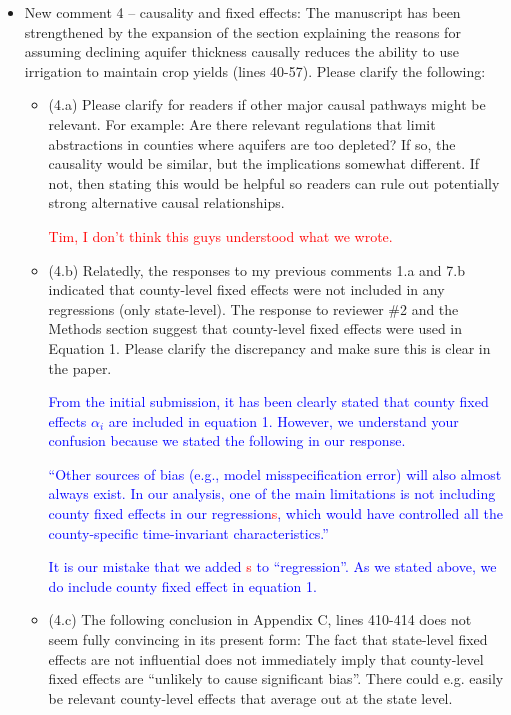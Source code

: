 \documentclass[
]{article}
\begin{document}
\begin{itemize}
\item New comment 4 – causality and fixed effects: The manuscript has been strengthened by the expansion of the section explaining the reasons for assuming declining aquifer thickness causally reduces the ability to use irrigation to maintain crop yields (lines 40-57). Please clarify the following:

  \begin{itemize}
  \item (4.a) Please clarify for readers if other major causal pathways might be relevant. For example: Are there relevant regulations that limit abstractions in counties where aquifers are too depleted? If so, the causality would be similar, but the implications somewhat different. If not, then stating this would be helpful so readers can rule out potentially strong alternative causal relationships.

  \textcolor{red}{Tim, I don't think this guys understood what we wrote.}
  
  \item (4.b) Relatedly, the responses to my previous comments 1.a and 7.b indicated that county-level fixed effects were not included in any regressions (only state-level). The response to reviewer \#2 and the Methods section suggest that county-level fixed effects were used in Equation 1. Please clarify the discrepancy and make sure this is clear in the paper.

  \textcolor{blue}{From the initial submission, it has been clearly stated that county fixed effects $\alpha_i$ are included in equation 1. However, we understand your confusion because we stated the following in our response.}

  \textcolor{blue}{``Other sources of bias (e.g., model misspecification error) will also almost always
exist. In our analysis, one of the main limitations is not including county fixed effects in our regression\textcolor{red}{s}, which would have controlled all the county-specific time-invariant characteristics.''}

  \textcolor{blue}{It is our mistake that we added \textcolor{red}{s} to ``regression''. As we stated above, we do include county fixed effect in equation 1. }
  
  \item (4.c) The following conclusion in Appendix C, lines 410-414 does not seem fully convincing in its present form: The fact that state-level fixed effects are not influential does not immediately imply that county-level fixed effects are ``unlikely to cause significant bias''. There could e.g. easily be relevant county-level effects that average out at the state level.


\end{itemize}
\end{itemize}
\end{document}
